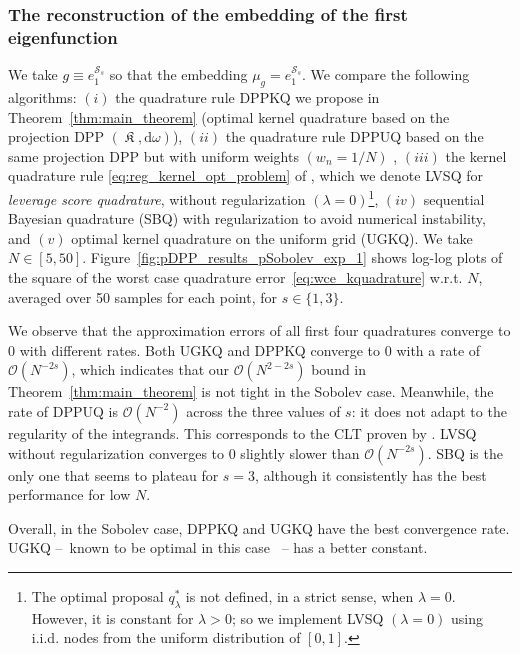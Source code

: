\documentclass[twoside,11pt]{book}
\numberwithin{theorem}{chapter}
\numberwithin{definition}{chapter}
\numberwithin{proposition}{chapter}
\numberwithin{corollary}{chapter}
\numberwithin{example}{chapter}
\numberwithin{lemma}{chapter}
\numberwithin{assumption}{chapter}
\numberwithin{equation}{chapter}
\numberwithin{figure}{chapter}
\DeclareMathOperator*{\KDPP}{\mathfrak{K}}
\begin{document}
\subsubsection{The reconstruction of the embedding of the first eigenfunction}
 We take $g\equiv e^{\mathcal{S}_{s}}_{1}$ so that the embedding $\mu_{g} = e^{\mathcal{S}_{s}}_{1}$. We compare the following algorithms: $(i)$ the quadrature rule DPPKQ we propose in Theorem~\ref{thm:main_theorem} (optimal kernel quadrature based on the projection DPP $(\KDPP, \mathrm{d}\omega)$), $(ii)$ the quadrature rule DPPUQ based on the same projection DPP but with uniform weights $(w_{n} = 1/N)$ \citep{Joh97}, $(iii)$ the kernel quadrature rule \eqref{eq:reg_kernel_opt_problem} of \cite{Bac17}, which we denote LVSQ for \emph{leverage score quadrature}, without regularization $(\lambda =0)$\footnote{The optimal proposal $q_{\lambda}^*$ is not defined, in a strict sense, when $\lambda = 0$. However, it is constant for $\lambda>0$; so we implement LVSQ $(\lambda = 0)$ using i.i.d. nodes from the uniform distribution of $[0,1]$.}, $(iv)$ sequential Bayesian quadrature (SBQ) \citep{HuDu12} with regularization to avoid numerical instability, and $(v)$ optimal kernel quadrature on the uniform grid (UGKQ). We take $N \in [5,50]$. Figure~\ref{fig:pDPP_results_pSobolev_exp_1} shows log-log plots of the square of the worst case quadrature error~\eqref{eq:wce_kquadrature} w.r.t. $N$, averaged over 50 samples for each point, for $s \in \{1,3\}$.


 We observe that the approximation errors of all first four quadratures converge to $0$ with different rates. Both UGKQ and DPPKQ converge to $0$ with a rate of $\mathcal{O}(N^{-2s})$, which indicates that our $\mathcal{O}(N^{2-2s})$ bound in Theorem~\ref{thm:main_theorem} is not tight in the Sobolev case. Meanwhile, the rate of DPPUQ is $\mathcal{O}(N^{-2})$ across the three values of $s$: it does not adapt to the regularity of the integrands. This corresponds to the CLT proven by \cite{Joh97}.
  LVSQ without regularization converges to $0$ slightly slower than $\mathcal{O}(N^{-2s})$. SBQ is the only one that seems to plateau for $s = 3$, although it consistently has the best performance for low $N$.


Overall, in the Sobolev case, DPPKQ and UGKQ have the best convergence rate. UGKQ --~known to be optimal in this case \citep{Boj81}~-- has a better constant.
\end{document}
